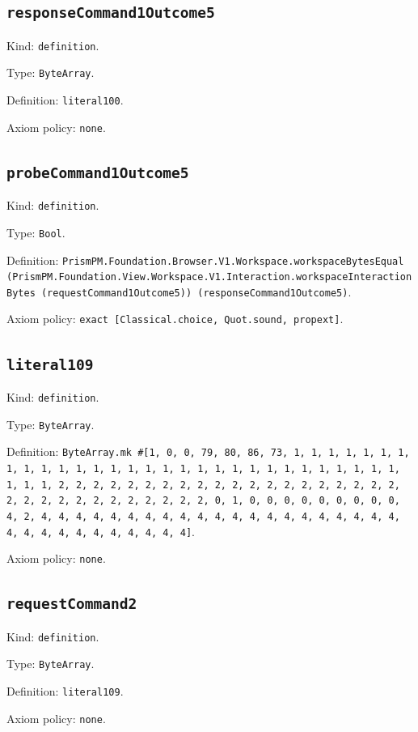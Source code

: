 \documentclass[11pt]{article}
\begin{document}
\subsection*{\texttt{responseCommand1Outcome5}}
\noindent Kind: \texttt{definition}.\par
\noindent Type: \texttt{ByteArray}.\par
\noindent Definition: \texttt{literal100}.\par
\noindent Axiom policy: \texttt{none}.\par
\subsection*{\texttt{probeCommand1Outcome5}}
\noindent Kind: \texttt{definition}.\par
\noindent Type: \texttt{Bool}.\par
\noindent Definition: \texttt{PrismPM.Foundation.Browser.V1.Workspace.workspaceBytesEqual (PrismPM.Foundation.View.Workspace.V1.Interaction.workspaceInteractionBytes (requestCommand1Outcome5)) (responseCommand1Outcome5)}.\par
\noindent Axiom policy: \texttt{exact [Classical.choice, Quot.sound, propext]}.\par
\subsection*{\texttt{literal109}}
\noindent Kind: \texttt{definition}.\par
\noindent Type: \texttt{ByteArray}.\par
\noindent Definition: \texttt{ByteArray.mk \#[1, 0, 0, 79, 80, 86, 73, 1, 1, 1, 1, 1, 1, 1, 1, 1, 1, 1, 1, 1, 1, 1, 1, 1, 1, 1, 1, 1, 1, 1, 1, 1, 1, 1, 1, 1, 1, 1, 1, 1, 2, 2, 2, 2, 2, 2, 2, 2, 2, 2, 2, 2, 2, 2, 2, 2, 2, 2, 2, 2, 2, 2, 2, 2, 2, 2, 2, 2, 2, 2, 2, 2, 0, 1, 0, 0, 0, 0, 0, 0, 0, 0, 0, 4, 2, 4, 4, 4, 4, 4, 4, 4, 4, 4, 4, 4, 4, 4, 4, 4, 4, 4, 4, 4, 4, 4, 4, 4, 4, 4, 4, 4, 4, 4, 4, 4, 4]}.\par
\noindent Axiom policy: \texttt{none}.\par
\subsection*{\texttt{requestCommand2}}
\noindent Kind: \texttt{definition}.\par
\noindent Type: \texttt{ByteArray}.\par
\noindent Definition: \texttt{literal109}.\par
\noindent Axiom policy: \texttt{none}.\par
\end{document}
